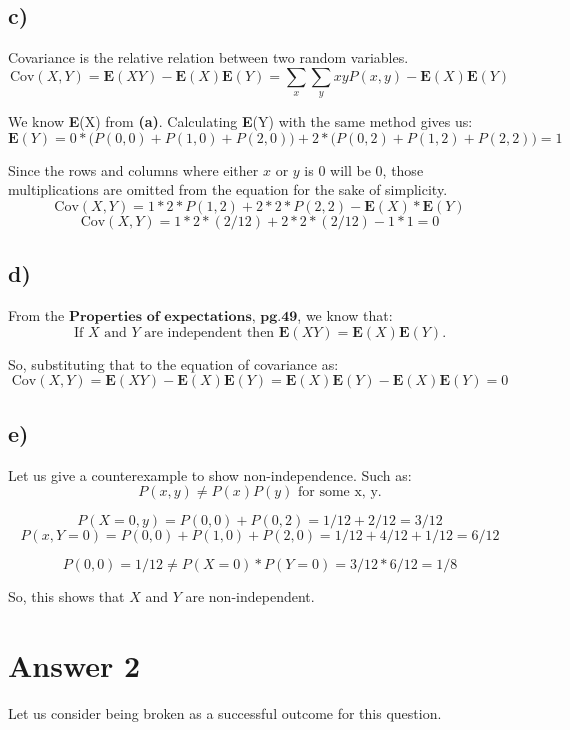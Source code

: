 \documentclass[12pt]{article}
\begin{document}
\newpage

\subsection*{c)}

Covariance is the relative relation between two random variables.
$$\text{Cov}(X, Y) = \textbf{E}(XY) - \textbf{E}(X)\textbf{E}(Y) = \sum_{x}\sum_{y}xyP(x, y) - \textbf{E}(X)\textbf{E}(Y)$$

We know \textbf{E}(X) from \textbf{(a)}. Calculating \textbf{E}(Y) with the same method gives us:
$$\textbf{E}(Y) = 0*\big(P(0, 0) + P(1, 0) + P(2, 0)\big) + 2*\big(P(0, 2) + P(1, 2) + P(2, 2)\big) = 1$$

Since the rows and columns where either $x$ or $y$ is $0$ will be $0$, those multiplications are omitted from the equation for the sake of simplicity.
$$\text{Cov}(X, Y) = 1*2*P(1, 2) + 2*2*P(2, 2) - \textbf{E}(X)*\textbf{E}(Y)$$
$$\text{Cov}(X, Y) = 1*2*(2/12) + 2*2*(2/12) - 1 * 1 = 0$$

\subsection*{d)}

From the $\textbf{Properties of expectations, pg.49}$, we know that:
$$\text{If $X$ and $Y$ are independent then } \textbf{E}(XY) = \textbf{E}(X)\textbf{E}(Y).$$

So, substituting that to the equation of covariance as:
$$\text{Cov}(X, Y) = \textbf{E}(XY) - \textbf{E}(X)\textbf{E}(Y) = \textbf{E}(X)\textbf{E}(Y) - \textbf{E}(X)\textbf{E}(Y) = 0$$

\subsection*{e)}
Let us give a counterexample to show non-independence. Such as:
$$P(x, y) \neq P(x)P(y) \text{ for some x, y.}$$

$$P(X = 0, y) = P(0, 0) + P(0, 2) = 1/12 + 2/12 = 3/12$$
$$P(x, Y = 0) = P(0, 0) + P(1, 0) + P(2, 0) = 1/12 + 4/12 + 1/12 = 6/12$$

$$P(0, 0) = 1/12 \boldsymbol\neq P(X = 0)*P(Y = 0) = 3/12*6/12 = 1/8$$

So, this shows that $X$ and $Y$ are non-independent.

\newpage

\section*{Answer 2}
Let us consider being broken as a successful outcome for this question.
\end{document}
